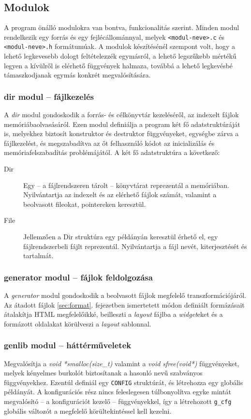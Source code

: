 \documentclass[a4paper,10pt]{article}
\begin{document}
\subsection{Modulok}
A program önálló modulokra van bontva, funkcionalitás szerint. Minden modul rendelkezik egy forrás és egy fejlécállománnyal, melyek \texttt{<modul-neve>.c} és \texttt{<modul-neve>.h} formátumúak. A modulok készítésénél szempont volt, hogy a lehető legkevesebb dologt feltételezzék egymásról, a lehető legszűkebb mértékű legyen a kívülről is elérhető függvények halmaza, továbbá a lehető legkevésbé támaszkodjanak egymás konkrét megvalósítására.
\subsubsection{dir modul -- fájlkezelés}
A \emph{dir} modul gondoskodik a forrás- és célkönyvtár kezeléséről, az indexelt fájlok memóriábaolvasásáról. Ezen modul definiálja a program két fő adatstruktúráját is, melyekhez biztosít konstruktor és destruktor függvényeket, egységbe zárva a fájlkezelést, és megszabadítva az őt felhasználó kódot az inicializálás és memóriafelszabadítás problémájától.
A két fő adatstruktúra a következő:

\begin{description}
	\item[Dir] Egy -- a fájlrendszeren tárolt -- könyvtárat reprezentál a memóriában. Nyilvántartja az indexelt és az elérhető fájlok számát, valamint a beolvasott fileokat, pointereken keresztül.
	\item[File] Jellemzően a Dir struktúra egy példányán keresztül érhető el, egy fájlrendszerbeli fájlt reprezentál. Nyilvántartja a fájl nevét, kiterjesztését és tartalmát.
\end{description}

\subsubsection{generator modul -- fájlok feldolgozása}
A \emph{generator} modul gondoskodik a beolvasott fájlok megfelelő transzformációjáról. Az átadott fájlok \ref{sec:format}. fejezetben ismertetett módon definiált formázásait átalakítja HTML megfelelőikké, beilleszti a \emph{layout} fájlba a \emph{widget}eket és a formázott oldalakat körülveszi a \emph{layout} sablonnal.

\subsubsection{genlib modul -- háttérműveletek}
Megvalósítja a \emph{void *smalloc(size\_t)} valamint a \emph{void sfree(void*)} függvényeket, melyek kényelmes burkolót biztosítanak a hasonló nevű szabványos függvényekhez. Ezentúl definiál egy \texttt{CONFIG} struktúrát, és létrehozza egy globális példányát. A konfigurációs rész nincs feleslegesen túlbonyolítva egyke mintát megvalósító -- a konfigurációt kezelő -- függvényekkel, így a létrehozott \texttt{g\_cfg} globális változót a megfelelő körültekintéssel kell kezelni.
\end{document}

